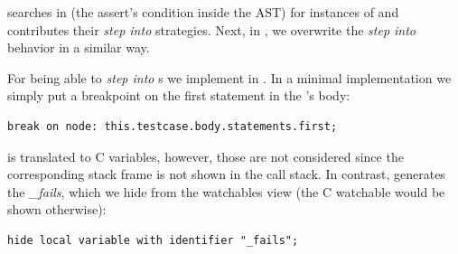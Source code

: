  searches in  (the assert's condition inside
the \ac{AST}) for instances of  and contributes their 
\emph{step into} strategies. Next, in , we overwrite
the \emph{step into} behavior in a similar way.

For being able to \emph{step into} s we implement
 in . In a minimal implementation we simply put
a breakpoint on the first statement in the 's body:
\begin{lstlisting}[language=mbeddr,frame=single]
break on node: this.testcase.body.statements.first;
\end{lstlisting}

  is translated to C 
variables, however, those are not considered since the
corresponding stack frame is not shown in the call stack. In
contrast,  generates the 
\emph{\_fails}, which we hide from
the watchables view (the C watchable would be shown otherwise):

\begin{lstlisting}[frame=single,language=mbeddr]
hide local variable with identifier "_fails";
\end{lstlisting}